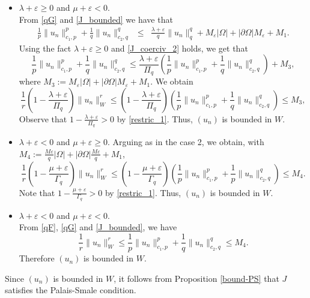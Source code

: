 \documentclass[pdflatex,sn-mathphys-num]{sn-jnl}
\theoremstyle{thmstyleone}%
\theoremstyle{thmstyletwo}%
\theoremstyle{thmstylethree}%
\theoremstyle{thmstylethree}%
\begin{document}
\begin{itemize}
\item[Case 2:]  $\lambda+\varepsilon \geqslant 0$ and $\mu+\varepsilon <0$.\\
From   \eqref{qG} and \eqref{J_bounded} we have that
\begin{eqnarray*}
       \frac{1}{p}\|u_n\|_{c_1, p}^p+\frac{1}{q}\|u_n\|_{c_2, q}^q &\leqslant &  
       \frac{\lambda +\varepsilon}{q}\|u_n\|_q^q  + M_\varepsilon|\Omega| +|\partial\Omega| M_\varepsilon  + M_1.
\end{eqnarray*}
Using the fact $\lambda+\varepsilon \geqslant0$ and  \eqref{J_coerciv_2} holds, we get that 
\begin{equation*}
     \frac{1}{p}\|u_n\|_{c_1, p}^p+\frac{1}{q}\|u_n\|_{c_2, q}^q \leqslant  \frac{\lambda+\varepsilon}{ {\Pi}_q}\left(\frac{1}{p}\|u_n\|_{c_1,p}^p +\frac{1}{q}\|u_n\|_{c_2,q}^q\right)+M_3,
\end{equation*}
where $M_3:=M_\varepsilon |\Omega| +|\partial\Omega| M_\varepsilon  + M_1.$
We   obtain
\begin{equation*}
    \frac{1}r \left(1-\frac{\lambda+\varepsilon}{ {\Pi}_q}\right) \|u_n\|_{W}^r\leqslant   \left(1-\frac{\lambda+\varepsilon}{ {\Pi}_q}\right)   \left(\frac{1}{p}\|u_n\|_{c_1,p}^p +\frac{1}{q}\|u_n\|_{c_2,q}^q\right)\leqslant M_3, 
\end{equation*}
Observe that $1-\frac{\lambda+\varepsilon}{ {\Pi}_q}>0$  by 
 \eqref{restric_1}. Thus, $(u_n)$ is bounded in $W$.
\\
\item[Case 3:]  
$\lambda+\varepsilon < 0$ and $\mu+ \varepsilon\geqslant 0$. Arguing as in the case 2, we obtain,
 with $M_4:=\frac{M\varepsilon}{q}|\Omega| +|\partial\Omega| \frac{M\varepsilon}{q}  + M_1$,
\begin{equation*}       \frac{1}r\left(1-\frac{\mu+\varepsilon}{ {\Gamma}_q} \right) \|u_n\|_{W}^r\leqslant\left(1-\frac{\mu+\varepsilon}{ {\Gamma}_q}\right)   \left(\frac{1}{p}\|u_n\|_{c_1,p}^p +\frac{1}{p}\|u_n\|_{c_2,q}^q\right)\leqslant M_4.
\end{equation*}
Note that $1-\frac{\mu+\varepsilon}{ {\Gamma}_q}>0$ by 
 \eqref{restric_1}. Thus, $(u_n)$ is bounded in $W$.

\item[Case 4:]
 $\lambda+\varepsilon<0$ and $\mu+\varepsilon<0.$\\  From \eqref{qF}, \eqref{qG} and \eqref{J_bounded}, we have 
\begin{equation*}
 \frac{1}r \|u_n\|_{W}^r\leqslant   \frac{1}{p}\|u_n\|_{c_1, p}^p+\frac{1}{q}\|u_n\|_{c_2, q}^q \leqslant  M_4. 
\end{equation*}
Therefore $(u_n)$ is bounded in $W$. 
\end{itemize}
Since $(u_n)$ is bounded in $W$, it follows from Proposition \ref{bound-PS}  that $J$ satisfies the Palais-Smale condition. 
\end{document}
